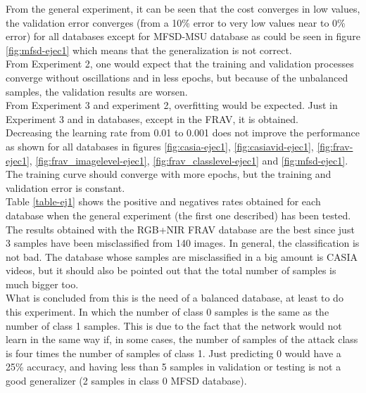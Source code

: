 From the general experiment, it can be seen that the cost converges in low values, the validation error converges (from a 10\% error to very low values near to 0\% error) for all databases except for MFSD-MSU database as could be seen in figure \ref{fig:mfsd-ejec1} which means that the generalization is not correct. \\

From Experiment 2, one would expect that the training and validation processes converge without oscillations and in less epochs, but because of the unbalanced samples, the validation results are worsen.\\

From Experiment 3 and experiment 2, overfitting would be expected. Just in Experiment 3 and in databases, except in the FRAV, it is obtained.\\

Decreasing the learning rate from 0.01 to 0.001 does not improve the performance as shown for all databases in figures \ref{fig:casia-ejec1}, \ref{fig:casiavid-ejec1}, \ref{fig:frav-ejec1}, \ref{fig:frav_imagelevel-ejec1}, \ref{fig:frav_classlevel-ejec1} and \ref{fig:mfsd-ejec1}. The  training curve should converge with more epochs, but the training and validation error is constant.\\

Table \ref{table-ej1} shows the positive and negatives rates obtained for each database when the general experiment (the first one described) has been tested. The results obtained with the RGB+NIR FRAV database are the best since just 3 samples have been misclassified from 140 images. In general, the classification is not bad. The database whose samples are misclassified in a big amount is CASIA videos, but it should also be pointed out that the total number of samples is much bigger too.\\

What is concluded from this is the need of a balanced database, at least to do this experiment. In which the number of class 0 samples is the same as the number of class 1 samples. This is due to the fact that the network would not learn in the same way if, in some cases, the number of samples of  the attack class is four times the number of samples of class 1. Just predicting 0 would have a 25\% accuracy, and having less than 5 samples in validation or testing is not a good generalizer (2 samples in class 0 MFSD database).


